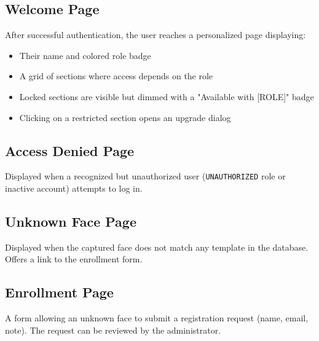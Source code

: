 
\subsection{Welcome Page}

After successful authentication, the user reaches a personalized page displaying:
\begin{itemize}[nosep]
    \item Their name and colored role badge
    \item A grid of sections where access depends on the role
    \item Locked sections are visible but dimmed with a "Available with [ROLE]" badge
    \item Clicking on a restricted section opens an upgrade dialog
\end{itemize}



\subsection{Access Denied Page}

Displayed when a recognized but unauthorized user (\texttt{UNAUTHORIZED} role or inactive account) attempts to log in.


\subsection{Unknown Face Page}

Displayed when the captured face does not match any template in the database. Offers a link to the enrollment form.


\subsection{Enrollment Page}

A form allowing an unknown face to submit a registration request (name, email, note). The request can be reviewed by the administrator.

